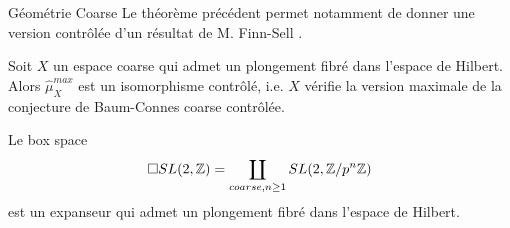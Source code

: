 \begin{frame}{Géométrie Coarse}
Le théorème précédent permet notamment de donner une version contrôlée d'un résultat de M. Finn-Sell \cite{FinnSellFibred}. \\
\vspace{0.3 cm}
\begin{corfr}
Soit $X$ un espace coarse qui admet un plongement fibré dans l'espace de Hilbert. Alors $\hat \mu_{X}^{max}$ est un isomorphisme contrôlé, i.e. $X$ vérifie la version maximale de la conjecture de Baum-Connes coarse contrôlée.\\
\end{corfr}
\vspace{0.3 cm}
Le box space
\[\square SL(2,\mathbb Z) = \coprod_{coarse , n\geq 1 } SL(2,\mathbb Z/ p^n \mathbb Z)\]
est un expanseur qui admet un plongement fibré dans l'espace de Hilbert.
\end{frame}






